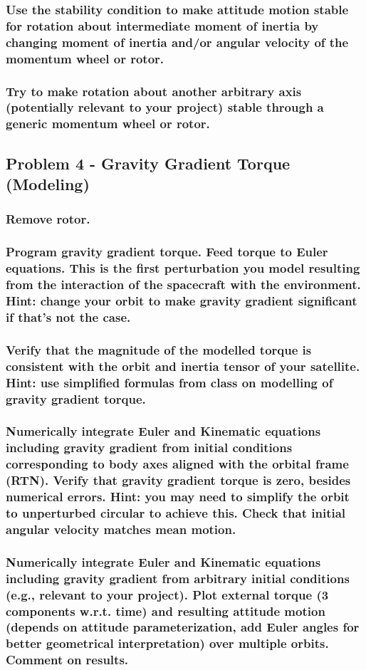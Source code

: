 \subsubsection{Use the stability condition to make attitude motion stable for rotation about intermediate moment
of inertia by changing moment of inertia and/or angular velocity of the momentum wheel or rotor.}

\subsubsection{Try to make rotation about another arbitrary axis (potentially relevant to your project) stable
through a generic momentum wheel or rotor.}

\subsection{Problem 4 - Gravity Gradient Torque (Modeling)}

\subsubsection{Remove rotor.}

\subsubsection{Program gravity gradient torque. Feed torque to Euler equations. This is the first perturbation you
model resulting from the interaction of the spacecraft with the environment. Hint: change your orbit
to make gravity gradient significant if that’s not the case.}

\subsubsection{Verify that the magnitude of the modelled torque is consistent with the orbit and inertia tensor of
your satellite. Hint: use simplified formulas from class on modelling of gravity gradient torque.}

\subsubsection{Numerically integrate Euler and Kinematic equations including gravity gradient from initial
conditions corresponding to body axes aligned with the orbital frame (RTN). Verify that gravity
gradient torque is zero, besides numerical errors. Hint: you may need to simplify the orbit to
unperturbed circular to achieve this. Check that initial angular velocity matches mean motion.}

\subsubsection{Numerically integrate Euler and Kinematic equations including gravity gradient from arbitrary
initial conditions (e.g., relevant to your project). Plot external torque (3 components w.r.t. time)
and resulting attitude motion (depends on attitude parameterization, add Euler angles for better
geometrical interpretation) over multiple orbits. Comment on results.}


